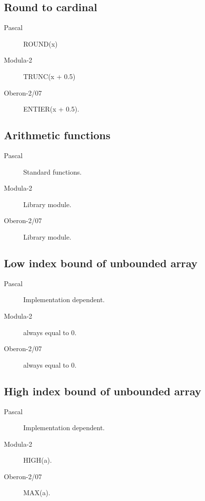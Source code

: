 \documentclass[10pt]{article}
\begin{document}
\subsection{Round to cardinal}
\begin{description}
    \item[Pascal] ROUND(x)
    
    \item[Modula-2] TRUNC(x + 0.5)
    
    \item[Oberon-2/07] ENTIER(x + 0.5).
\end{description}

\subsection{Arithmetic functions}
\begin{description}
    \item[Pascal] Standard functions.
    
    \item[Modula-2] Library module.
    
    \item[Oberon-2/07] Library module.
\end{description}

\subsection{Low index bound of unbounded array}
\begin{description}
    \item[Pascal] Implementation dependent.
    
    \item[Modula-2] always equal to 0.
    
    \item[Oberon-2/07] always equal to 0.
\end{description}

\subsection{High index bound of unbounded array}
\begin{description}
    \item[Pascal] Implementation dependent.
    
    \item[Modula-2] HIGH(a).
    
    \item[Oberon-2/07] MAX(a).
\end{description}
\end{document}
